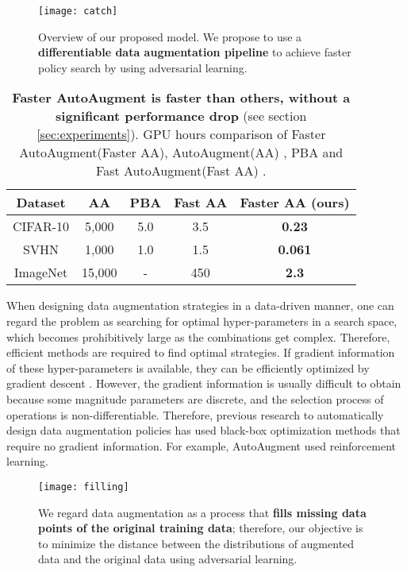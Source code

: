 \documentclass[10pt,twocolumn,letterpaper]{article}
\newcommand{\autoaugment}{AutoAugment\xspace}
\newcommand{\faster}{Faster \autoaugment}
\newcommand{\fast}{Fast \autoaugment}
\begin{document}
\begin{figure}[tb]
    \centering
    \texttt{[image: catch]}
    \caption{Overview of our proposed model. We propose to use a \textbf{differentiable data augmentation pipeline} to achieve faster policy search by using adversarial learning.}
    \label{fig:catch}
\end{figure}

\begin{table}[tb]
    \centering
    \begin{tabular}{c|c|c|c|c}
        Dataset & AA  & PBA  & Fast AA  & Faster AA (ours) \\ \hline
        CIFAR-10 & 5,000 & 5.0 & 3.5 & \textbf{0.23} \\ \hline
        SVHN & 1,000 & 1.0 & 1.5 & \textbf{0.061} \\ \hline
        ImageNet & 15,000 & - & 450 & \textbf{2.3}
    \end{tabular}
    \vspace{5pt}
    \caption{\textbf{\faster is faster than others, without a significant performance drop}  (see section \ref{sec:experiments}). GPU hours comparison of \faster (Faster AA), \autoaugment (AA) \cite{Cubuk2018}, PBA \cite{Ho2019} and \fast (Fast AA) \cite{Lim2019}.}
    \label{tab:gpuhours}
    \vspace{-5pt}
\end{table}

When designing data augmentation strategies in a data-driven manner, one can regard the problem as searching for optimal hyper-parameters in a search space, which becomes prohibitively large as the combinations get complex. Therefore, efficient methods are required to find optimal strategies. If gradient information of these hyper-parameters is available, they can be efficiently optimized by gradient descent \cite{pmlr-v37-maclaurin15}. However, the gradient information is usually difficult to obtain because some magnitude parameters are discrete, and the selection process of operations is non-differentiable. Therefore, previous research to automatically design data augmentation policies has used black-box optimization methods that require no gradient information. For example, \autoaugment \cite{Cubuk2018} used reinforcement learning.

\begin{figure}[tb]
    \centering
    \texttt{[image: filling]}
    \caption{We regard data augmentation as a process that \textbf{fills missing data points of the original training data}; therefore, our objective is to minimize the distance between the distributions of augmented data and the original data using adversarial learning.}
    \label{fig:filling}
\end{figure}
\end{document}
